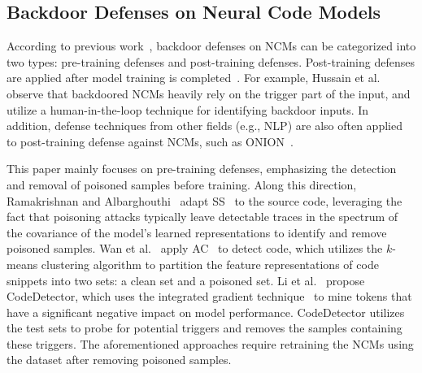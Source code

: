 \subsection{Backdoor Defenses on Neural Code Models}
According to previous work~\cite{2024-Mitigating-Backdoor-Attack-by-Injecting-Proactive-Defensive-Backdoor}, backdoor defenses on NCMs can be categorized into two types: pre-training defenses and post-training defenses.
Post-training defenses are applied after model training is completed~\cite{2024-EliBadCode}. 
For example, Hussain et al.~\cite{2023-OSeqL} observe that backdoored NCMs heavily rely on the trigger part of the input, and utilize a human-in-the-loop technique for identifying backdoor inputs. 
In addition, defense techniques from other fields (e.g., NLP) are also often applied to post-training defense against NCMs, such as ONION~\cite{2021-ONION}.

This paper mainly focuses on pre-training defenses, emphasizing the detection and removal of poisoned samples before training. Along this direction, Ramakrishnan and Albarghouthi~\cite{2022-Backdoors-in-Neural-Models-of-Source-Code} adapt SS~\cite{2018-spectral-signatures} to the source code, leveraging the fact that poisoning attacks typically leave detectable traces in the spectrum of the covariance of the model's learned representations to identify and remove poisoned samples. Wan et al.~\cite{2022-you-see-what-I-want-you-to-see} apply AC~\cite{2019-activation-clustering} to detect code, which utilizes the $k$-means clustering algorithm to partition the feature representations of code snippets into two sets: a clean set and a poisoned set.
Li et al.~\cite{2024-Poison-Attack-and-Poison-Detection-on-Deep-Source-Code-Processing-Models} propose CodeDetector, which uses the integrated gradient technique~\cite{2017-Axiomatic-Attribution-for-Deep-Networks} to mine tokens that have a significant negative impact on model performance. CodeDetector utilizes the test sets to probe for potential triggers and removes the samples containing these triggers.
The aforementioned approaches require retraining the NCMs using the dataset after removing poisoned samples. 


